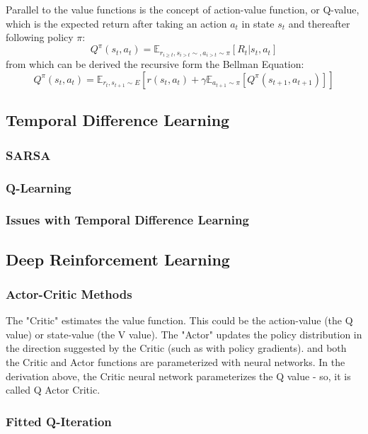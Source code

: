 Parallel to the value functions is the concept of action-value function, or Q-value, which is the expected return after taking an action \(a_t\) in state \(s_t\) and thereafter following policy \(\pi\):
\[Q^\pi(s_t,a_t)=\mathbb{E}_{r_{i \geq t},s_{i>t} \sim ,a_{i>t} \sim \pi}[R_t|s_t,a_t]\]
from which can be derived the recursive form the Bellman Equation:
\[Q^\pi(s_t,a_t)=\mathbb{E}_{r_t,s_{t+1} \sim E }\left[ r(s_t,a_t) + \gamma \mathbb{E}_{a_{t+1} \sim \pi}\left[Q^\pi (s_{t+1},a_{t+1})\right]\right]\]


\subsection{Temporal Difference Learning}
\subsubsection{SARSA}

\subsubsection{Q-Learning}
\subsubsection{Issues with Temporal Difference Learning}
\subsection{Deep Reinforcement Learning}

\subsubsection{Actor-Critic Methods}
The "Critic" estimates the value function. This could be the action-value (the Q value) or state-value (the V value).
The "Actor" updates the policy distribution in the direction suggested by the Critic (such as with policy gradients).
and both the Critic and Actor functions are parameterized with neural networks. In the derivation above, the Critic neural network parameterizes the Q value - so, it is called Q Actor Critic.
\subsubsection{Fitted Q-Iteration}

